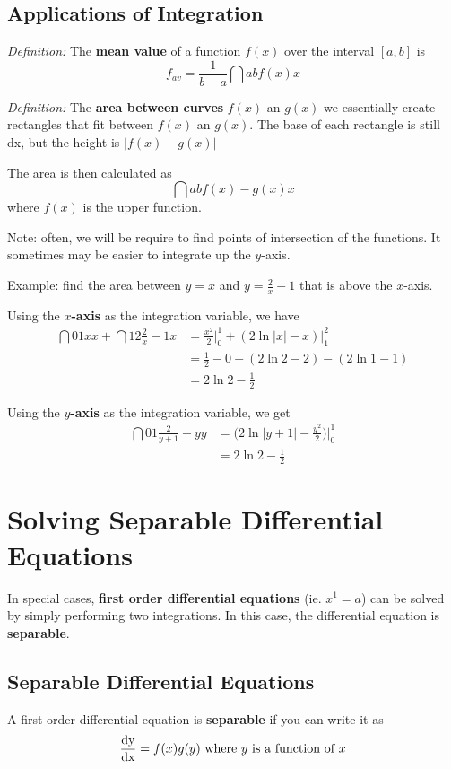 \documentclass[12pt]{article}
\begin{document}
\subsection*{Applications of Integration}
\textit{Definition:} The {\bf mean value} of a function $f(x)$ over the interval $[a,b]$ is \[ f_{av} = \frac{1}{b-a}\dint{a}{b}{f(x)}{x} \]

\textit{Definition:} The {\bf area between curves} $f(x)$ an $g(x)$ we essentially create rectangles that fit between $f(x)$ an $g(x)$. The base of each rectangle is still dx, but the height is $|f(x) - g(x)|$

The area is then calculated as \[ \dint{a}{b}{f(x)-g(x)}{x} \] where $f(x)$ is the upper function.

Note: often, we will be require to find points of intersection of the functions. It sometimes may be easier to integrate up the $y$-axis.

Example: find the area between $y = x$ and $y = \frac{2}{x} - 1$ that is above the $x$-axis.

Using the {\bf $x$-axis} as the integration variable, we have
\begin{align*}
\dint{0}{1}{x}{x} + \dint{1}{2}{\frac{2}{x} - 1}{x} &= \frac{x^2}{2}\bigg|_0^1 + (2\ln|x| - x)\bigg|_1^2\\
&= \frac{1}{2} - 0 + (2\ln 2 - 2) - (2\ln 1 - 1)\\
&= 2\ln 2 - \frac{1}{2}
\end{align*}

Using the {\bf $y$-axis} as the integration variable, we get
\begin{align*}
\dint{0}{1}{\frac{2}{y+1} - y}{y} &= \bigg(2\ln|y+1| - \frac{y^2}{2}\bigg)\bigg|_0^1\\
&= 2\ln 2 - \frac{1}{2}
\end{align*}

\section*{Solving Separable Differential Equations}
In special cases, {\bf first order differential equations} (ie. $x^1 = a$) can be solved by simply performing two integrations. In this case, the differential equation is {\bf separable}.

\subsection*{Separable Differential Equations}
A first order differential equation is {\bf separable} if you can write it as \[ \frac{{\rm dy}}{{\rm dx}} = f(x)g(y) \text{ where $y$ is a function of $x$} \]
\end{document}
